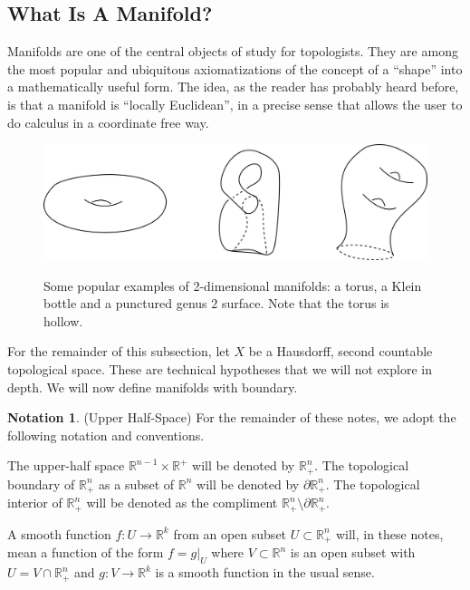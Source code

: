 \documentclass[12pt]{article}
\theoremstyle{definition}
\newtheorem{notation}[theorem]{Notation}
\numberwithin{equation}{section}
\newcommand{\R}{{\mathbb R}}
\begin{document}
\subsection{What Is A Manifold?} \label{subsec:whats_a_manifold} Manifolds are one of the central objects of study for topologists. They are among the most popular and ubiquitous axiomatizations of the concept of a ``shape'' into a mathematically useful form. The idea, as the reader has probably heard before, is that a manifold is ``locally Euclidean'', in a precise sense that allows the user to do calculus in a coordinate free way. 

\begin{figure}[h]
    \centering
    \includegraphics[width=1\textwidth]{reu_figures/surfaces.png}
    \label{fig:surfaces}
    \caption{Some popular examples of 2-dimensional manifolds: a torus, a Klein bottle and a punctured genus $2$ surface. Note that the torus is hollow.}
\end{figure}
For the remainder of this subsection, let $X$ be a Hausdorff, second countable topological space. These are technical hypotheses that we will not explore in depth. We will now define manifolds with boundary.

\begin{notation} (Upper Half-Space) For the remainder of these notes, we adopt the following notation and conventions.

The upper-half space $\R^{n-1} \times \R^+$ will be denoted by $\R^n_+$. The topological boundary of $\R^n_+$ as a subset of $\R^n$ will be denoted by $\partial \R^n_+$. The topological interior of $\R^n_+$ will be denoted as the compliment $\R^n_+\setminus \partial \R^n_+$.

A smooth function $f:U \to \R^k$ from an open subset $U \subset \R^n_+$ will, in these notes, mean a function of the form $f = g|_U$ where $V \subset \R^n$ is an open subset with $U = V \cap \R^n_+$ and $g:V \to \R^k$ is a smooth function in the usual sense. \end{notation}
\end{document}

